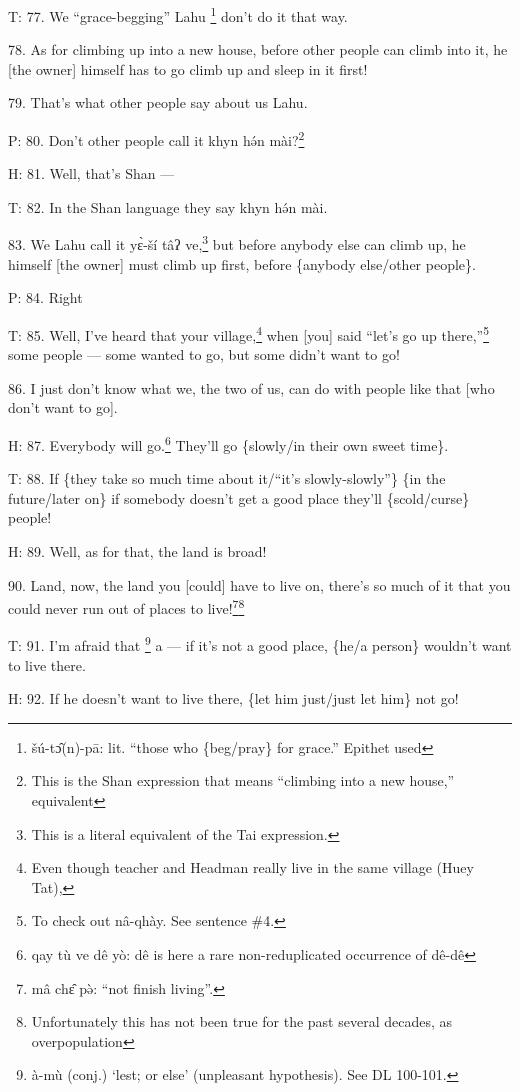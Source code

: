 T: 77. We ``grace-begging'' Lahu \footnote{šú-tɔ̂(n)-pā: lit. ``those who \{beg/pray\} for grace.'' Epithet used} don't do it that way.

78. As for climbing up into a new house, before other people can climb into it,
he [the owner] himself has to go climb up and sleep in it first!

79. That's what other people say about us Lahu.

P: 80. Don't other people call it khyn hə́n mài?\footnote{This is the Shan expression that means ``climbing into a new house,'' equivalent}

H: 81. Well, that's Shan ---

T: 82. In the Shan language they say khyn hə́n mài.

83. We Lahu call it yɛ̀-ší tâʔ ve,\footnote{This is a literal equivalent of the Tai expression.} but before anybody else can climb
up, he himself [the owner] must climb up first, before \{anybody else/other people\}.

P: 84. Right

T: 85. Well, I've heard that your village,\footnote{Even though teacher and Headman really live in the same village (Huey Tat),} when [you] said ``let's go up there,''\footnote{To check out nâ-qhày. See sentence \#4.}
some people --- some wanted to go, but some didn't want to go!

86. I just don't know what we, the two of us, can do with people like that [who
don't want to go].

H: 87. Everybody will go.\footnote{qay tù ve dê yò: dê is here a rare non-reduplicated occurrence of dê-dê} They'll go \{slowly/in their own sweet time\}.

T: 88. If \{they take so much time about it/``it's slowly-slowly''\} \{in the future/later
on\} if somebody doesn't get a good place they'll \{scold/curse\} people!

H: 89. Well, as for that, the land is broad!

90. Land, now, the land you [could] have to live on, there's so much of it that
you could never run out of places to live!\footnote{mâ chɛ̂ pə̀: ``not finish living''.}\footnote{Unfortunately this has not been true for the past several decades, as overpopulation}

T: 91. I'm afraid that \footnote{à-mù (conj.) `lest; or else' (unpleasant hypothesis). See DL 100-101.} a --- if it's not a good place, \{he/a person\} wouldn't
want to live there.

H: 92. If he doesn't want to live there, \{let him just/just let him\} not go!

